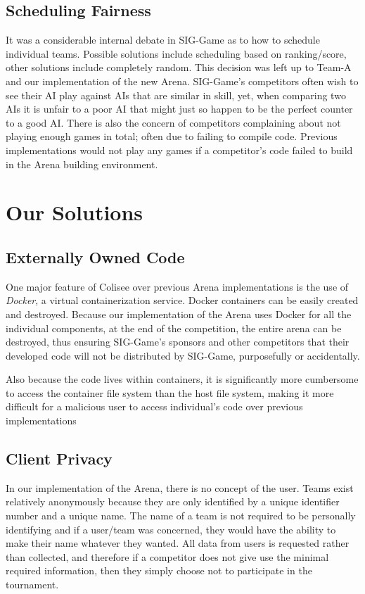 \documentclass{article}
\begin{document}
\subsection{Scheduling Fairness}
It was a considerable internal debate in SIG-Game as to how to schedule individual teams. Possible solutions include scheduling based on ranking/score, other solutions include completely random. This decision was left up to Team-A and our implementation of the new Arena. SIG-Game's competitors often wish to see their AI play against AIs that are similar in skill, yet, when comparing two AIs it is unfair to a poor AI that might just so happen to be the perfect counter to a good AI.
There is also the concern of competitors complaining about not playing enough games in total; often due to failing to compile code. Previous implementations would not play any games if a competitor's code failed to build in the Arena building environment.

\newpage
\section{Our Solutions}
\subsection{Externally Owned Code}
One major feature of Colisee over previous Arena implementations is the use of \textit{Docker}, a virtual containerization service. Docker containers can be easily created and destroyed. Because our implementation of the Arena uses Docker for all the individual components, at the end of the competition, the entire arena can be destroyed, thus ensuring SIG-Game's sponsors and other competitors that their developed code will not be distributed by SIG-Game, purposefully or accidentally.

Also because the code lives within containers, it is significantly more cumbersome to access the container file system than the host file system, making it more difficult for a malicious user to access individual's code over previous implementations

\subsection{Client Privacy}
In our implementation of the Arena, there is no concept of the user. Teams exist relatively anonymously because they are only identified by a unique identifier number and a unique name. The name of a team is not required to be personally identifying and if a user/team was concerned, they would have the ability to make their name whatever they wanted. All data from users is requested rather than collected, and therefore if a competitor does not give use the minimal required information, then they simply choose not to participate in the tournament. 
\end{document}
